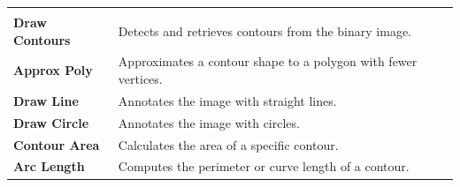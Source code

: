 \documentclass[runningheads]{llncs}
\begin{document}
\begin{table}[tb]
\begin{tabularx}{\textwidth}{>{\bfseries}l X}
        \rowcolor{gray!15} \multicolumn{2}{c}{\textbf{\textsc{Drawing}}} \\
        Draw Contours & Detects and retrieves contours from the binary image. \\
        Approx Poly & Approximates a contour shape to a polygon with fewer vertices. \\
        Draw Line & Annotates the image with straight lines. \\
        Draw Circle & Annotates the image with circles. \\
        Contour Area & Calculates the area of a specific contour. \\
        Arc Length & Computes the perimeter or curve length of a contour. \\
        \bottomrule
    \end{tabularx}
\end{table}
    
    
        
        
\end{document}
